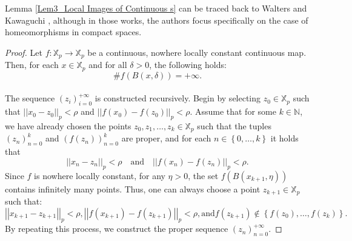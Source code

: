 \documentclass[a4paper, 12pt]{article}
\theoremstyle{definition}
\begin{document}
	Lemma \ref{Lem3_Local Images of Continuous s} can be traced back to Walters \cite[Lemma 9]{Walters_On_the_Pseudo_Orbit_Tracing_Property_and_its_relationship_to_Stability} and Kawaguchi \cite[Proof of Lemma 1.1]{Kawaguchi_Topological_Stability_and_Shadowing_of_Zero-dimensional_Dynamical_Systems}, 
	although in those works, the authors focus specifically on the case of homeomorphisms in compact spaces. 
	
	
	\begin{proof}
		
		Let $f: \mathbb{X}_{p} \to \mathbb{X}_{p}$ be a continuous, nowhere locally constant continuous map. 
		Then, for each $x \in \mathbb{X}_{p}$ and for all $\delta  > 0$, the following holds: 
		\begin{equation}\label{Eq_Local Images of Continous s}    
			\# f \left(  B \left(  x, \delta  \right)   \right)     =   + \infty  .
		\end{equation}
		
		
		\paragraph{}
		The sequence $ \left(  z_{i}   \right)_{i=0}^{+ \infty }$ is constructed recursively.
		Begin by selecting $z_{0} \in \mathbb{X}_{p}$ such that $  \left| \left|  x_{0} - z_{0}  \right|  \right|_{p}  < \rho$ and $  \left| \left|  f \left(  x_{0} \right)  - f \left(  z_{0}  \right)   \right|  \right|_{p}  < \rho$.  
		Assume that for some $k \in \mathbb{N} $, we have already chosen the points $z_{0}, z_{1}, \dots, z_{k} \in \mathbb{X}_{p}$ such that the tuples $  \left(  z_{n}   \right)_{n=0}^{k}$ and $ \left(  f \left(  z_{n}  \right)    \right)_{n=0}^{k}$ are proper, and for each $n \in  \left\{  0, \dots, k  \right\} $ it holds that 
		$$  \left| \left|  x_{n} - z_{n}  \right|  \right|_{p}   <   \rho \quad \text{and} \quad   \left| \left|  f \left(  x_{n}  \right)  - f \left(  z_{n}  \right)   \right|  \right|_{p}    <   \rho .$$
		Since $f$ is nowhere locally constant, for any $  \eta  > 0$, the set $f \left(  B \left(  x_{k+1},  \eta  \right)   \right) $ contains infinitely many points. Thus, one can always choose a point $z_{k+1} \in \mathbb{X}_{p}$ such that:
		$$ \left| \left|  x_{k+1} - z_{k+1}  \right|  \right|_{p}  < \rho,    \left| \left|  f \left(  x_{k+1}  \right)  - f \left(  z_{k+1}  \right)   \right|  \right|_{p} < \rho,   \text{and}   f \left(  z_{k+1}  \right)  \not\in  \left\{  f \left(  z_{0}  \right) , \dots, f \left(  z_{k}  \right)   \right\} . $$ 
		By repeating this process, we construct the proper sequence $ \left(  z_{n}   \right)_{n=0}^{+ \infty }$. 
		

\end{proof}
\end{document}
